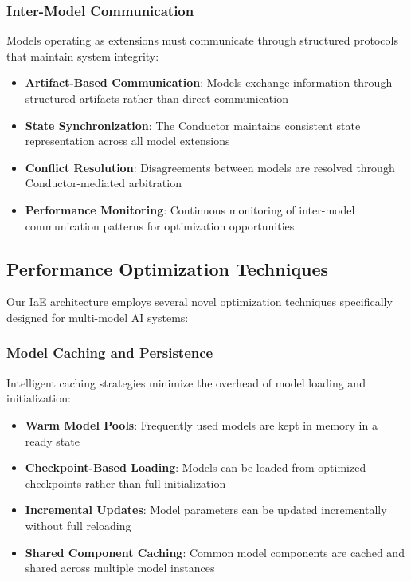 \subsubsection{Inter-Model Communication}

Models operating as extensions must communicate through structured protocols that maintain system integrity:

\begin{itemize}
    \item \textbf{Artifact-Based Communication}: Models exchange information through structured artifacts rather than direct communication
    \item \textbf{State Synchronization}: The Conductor maintains consistent state representation across all model extensions
    \item \textbf{Conflict Resolution}: Disagreements between models are resolved through Conductor-mediated arbitration
    \item \textbf{Performance Monitoring}: Continuous monitoring of inter-model communication patterns for optimization opportunities
\end{itemize}

\subsection{Performance Optimization Techniques}

Our IaE architecture employs several novel optimization techniques specifically designed for multi-model AI systems:

\subsubsection{Model Caching and Persistence}

Intelligent caching strategies minimize the overhead of model loading and initialization:

\begin{itemize}
    \item \textbf{Warm Model Pools}: Frequently used models are kept in memory in a ready state
    \item \textbf{Checkpoint-Based Loading}: Models can be loaded from optimized checkpoints rather than full initialization
    \item \textbf{Incremental Updates}: Model parameters can be updated incrementally without full reloading
    \item \textbf{Shared Component Caching}: Common model components are cached and shared across multiple model instances
\end{itemize}


